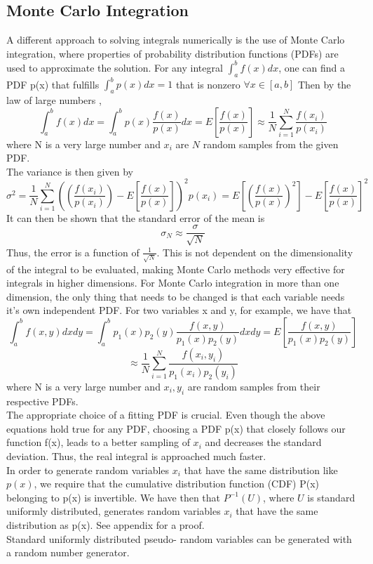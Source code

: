 \documentclass[10pt,a4paper]{article}
\begin{document}
\subsection{Monte Carlo Integration}
A different approach to solving integrals numerically is the use of Monte Carlo integration, where properties of probability distribution functions (PDFs) are used to approximate the solution. For any integral $\int_a^bf(x)dx$, one can find a PDF p(x) that fulfills  $\int_a^bp(x)dx=1$ that is nonzero $ \forall x\in [a,b]$ Then by the law of large numbers \cite{devore2012modern},
$$\int_a^bf(x)dx=\int_a^bp(x)\frac{f(x)}{p(x)}dx=E\left[\frac{f(x)}{p(x)}\right]\approx \frac{1}{N}\sum_{i=1}^{N}\frac{f(x_i)}{p(x_i)}$$
where N is a very large number and $x_i$ are $N$ random samples from the given PDF.\\
The variance is then given by
\[
\sigma^2=\frac{1}{N}\sum_{i=1}^{N}\left(\left( \frac{f(x_i)}{p(x_i)}\right)-E \left[\frac{f(x)}{p(x)} \right]\right)^2 p(x_i)=E\left[ \left( \frac{f(x)}{p(x)}\right)^2\right]-E\left[\frac{f(x)}{p(x)}\right]^2
\]
It can then be shown \cite{devore2012modern} that the standard error of the mean is
$$
\sigma_N \approx \frac{\sigma}{\sqrt{N}}
$$
Thus, the error is a function of $\frac{1}{\sqrt{N}}$. This is not dependent on the dimensionality of the integral to be evaluated, making Monte Carlo methods very effective for integrals in higher dimensions.
For Monte Carlo integration in more than one dimension, the only thing that needs to be changed is that each variable needs it's own independent PDF. For two variables x and y, for example, we have that 
$$\int_a^bf(x,y)dxdy=\int_a^bp_1(x)p_2(y)\frac{f(x,y)}{p_1(x)p_2(y)}dxdy=E\left[\frac{f(x,y)}{p_1(x)p_2(y)}\right]$$
$$\approx \frac{1}{N}\sum_{i=1}^{N}\frac{f(x_i,y_i)}{p_1(x_i)p_2(y_i)}$$
where N is a very large number and $x_i, y_i$ are random samples from their respective PDFs.\\
The appropriate choice of a fitting PDF is crucial. Even though the above equations hold true for any PDF, choosing a PDF p(x) that closely follows our function f(x), leads to a better sampling of $x_i$ \cite{devore2012modern} and decreases the standard deviation. Thus, the real integral is approached much faster.\\
In order to generate random variables $x_i$ that have the same distribution like $p(x)$, we require that the cumulative distribution function (CDF) P(x) belonging to p(x) is invertible. We have then that $P^{-1}(U)$, where $U$ is standard uniformly distributed, generates random variables $x_i$ that have the same distribution as p(x). See appendix for a proof.\\
Standard uniformly distributed pseudo- random variables can be generated with a random number generator. 
\end{document}
